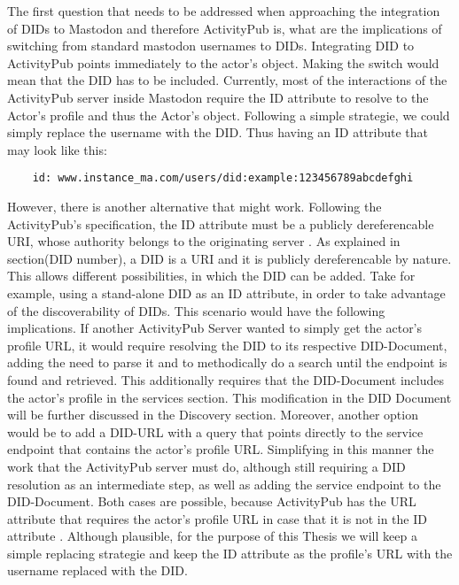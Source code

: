 The first question that needs to be addressed when approaching the integration of DIDs to Mastodon and therefore ActivityPub is, what are the implications of switching from standard mastodon usernames to DIDs. Integrating DID to ActivityPub points immediately to the actor’s object. Making the switch would mean that the DID has to be included. Currently, most of the interactions of the ActivityPub server inside Mastodon require the ID attribute to resolve to the Actor’s profile and thus the Actor’s object. Following a simple strategie, we could simply replace the username with the DID. Thus having an ID attribute that may look like this: 

\begin{lstlisting}
	id: www.instance_ma.com/users/did:example:123456789abcdefghi 
\end{lstlisting}

However, there is another alternative that might work. Following the ActivityPub’s  specification, the ID attribute must be a publicly dereferencable URI, whose authority belongs to the originating server \cite{lemmer-webber_tallon_guy_prodromou_2018}. As explained in section(DID number), a DID is a URI and it is publicly dereferencable by nature. This allows different possibilities, in which the DID can be added. Take for example, using a stand-alone DID as an ID attribute, in order to take advantage of the discoverability of DIDs. This scenario would have the following implications. If another ActivityPub Server wanted to simply get the actor’s profile URL, it would require resolving the DID to its respective DID-Document, adding the need to parse it and to methodically do a search until the endpoint is found and retrieved. This additionally requires that the DID-Document includes the actor’s profile in the services section. This modification in the DID Document will be further discussed in the Discovery section. Moreover, another option would be to add a DID-URL with a query that points directly to the service endpoint that contains the actor’s profile URL. Simplifying in this manner the work that the ActivityPub server must do, although  still requiring a DID resolution as an intermediate step, as well as adding the service endpoint to the DID-Document. Both cases are possible, because ActivityPub has the URL attribute that requires the actor’s profile URL in case that it is not in the ID attribute \cite{lemmer-webber_tallon_guy_prodromou_2018}. Although plausible, for the purpose of this Thesis we will keep a simple replacing strategie and keep the ID attribute as the profile’s URL with the username replaced with the DID. 

